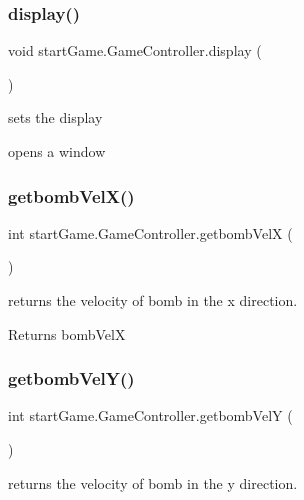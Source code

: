 \subsubsection{\texorpdfstring{display()}{display()}}
{\footnotesize\ttfamily void start\+Game.\+Game\+Controller.\+display (\begin{DoxyParamCaption}{ }\end{DoxyParamCaption})}



sets the display 

opens a window \hypertarget{classstart_game_1_1_game_controller_a1b902c1d6b489b6499c340b1db67e868}{}\label{classstart_game_1_1_game_controller_a1b902c1d6b489b6499c340b1db67e868} 
\subsubsection{\texorpdfstring{getbomb\+Vel\+X()}{getbombVelX()}}
{\footnotesize\ttfamily int start\+Game.\+Game\+Controller.\+getbomb\+VelX (\begin{DoxyParamCaption}{ }\end{DoxyParamCaption})}



returns the velocity of bomb in the x direction. 

\begin{DoxyReturn}{Returns}
bomb\+VelX 
\end{DoxyReturn}
\hypertarget{classstart_game_1_1_game_controller_a8996d95affa45808c489767da11b6622}{}\label{classstart_game_1_1_game_controller_a8996d95affa45808c489767da11b6622} 
\subsubsection{\texorpdfstring{getbomb\+Vel\+Y()}{getbombVelY()}}
{\footnotesize\ttfamily int start\+Game.\+Game\+Controller.\+getbomb\+VelY (\begin{DoxyParamCaption}{ }\end{DoxyParamCaption})}



returns the velocity of bomb in the y direction. 

